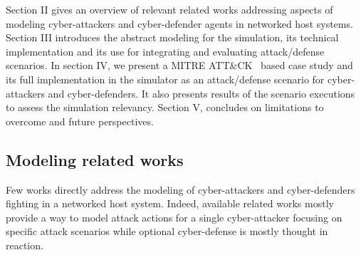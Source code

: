 Section II gives an overview of relevant related works addressing aspects of modeling cyber-attackers and cyber-defender agents in networked host systems. Section III introduces the abstract modeling for the simulation, its technical implementation and its use for integrating and evaluating attack/defense scenarios. In section IV, we present a MITRE ATT\&CK~\cite{MITREATTACKWebiste} based case study and its full implementation in the simulator as an attack/defense scenario for cyber-attackers and cyber-defenders. It also presents results of the scenario executions to assess the simulation relevancy. Section V, concludes on limitations to overcome and future perspectives.


\subsection{Modeling related works}

\noindent

Few works directly address the modeling of cyber-attackers and cyber-defenders fighting in a networked host system. Indeed, available related works mostly provide a way to model attack actions for a single cyber-attacker focusing on specific attack scenarios while optional cyber-defense is mostly thought in reaction.


